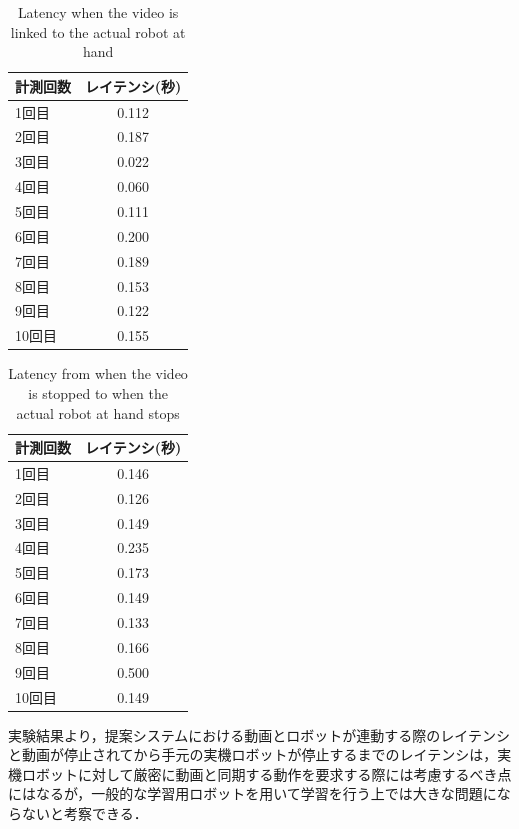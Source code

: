 \documentclass{ujarticle}
\begin{document}
\begin{table}[t]
 \caption{Latency when the video is linked to the actual robot at hand}
 \label{tbl:Latency_forward_result}
 \centering
 \footnotesize
 \begin{tabular}{|p{}|c|}
  \hline
	計測回数 &レイテンシ(秒) \\\hline
	1回目	&0.112 \\\hline
	2回目	&0.187 \\\hline
	3回目	&0.022 \\\hline
	4回目 &0.060 \\\hline
  5回目	&0.111 \\\hline
  6回目	&0.200 \\\hline
  7回目	&0.189 \\\hline
  8回目	&0.153 \\\hline
  9回目	&0.122 \\\hline
  10回目 &0.155 \\\hline
 \end{tabular}
\end{table}

\begin{table}[t]
 \caption{Latency from when the video is stopped to when the actual robot at hand stops}
 \label{tbl:Latency_stop_result}
 \centering
 \footnotesize
 \begin{tabular}{|p{}|c|}
  \hline
	計測回数 &レイテンシ(秒) \\\hline
	1回目	&0.146 \\\hline
	2回目	&0.126 \\\hline
	3回目	&0.149 \\\hline
	4回目 &0.235 \\\hline
  5回目	&0.173 \\\hline
  6回目	&0.149 \\\hline
  7回目	&0.133 \\\hline
  8回目	&0.166 \\\hline
  9回目	&0.500 \\\hline
  10回目 &0.149 \\\hline
 \end{tabular}
\end{table}

\par 実験結果より，提案システムにおける動画とロボットが連動する際のレイテンシと動画が停止されてから手元の実機ロボットが停止するまでのレイテンシは，実機ロボットに対して厳密に動画と同期する動作を要求する際には考慮するべき点にはなるが，一般的な学習用ロボットを用いて学習を行う上では大きな問題にならないと考察できる．
\end{document}
